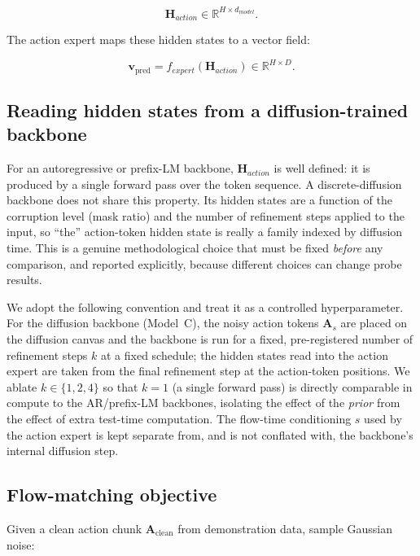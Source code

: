 \documentclass[11pt]{article}
\newcommand{\vect}[1]{\mathbf{#1}}
\newcommand{\Aclean}{\vect{A}_{\mathrm{clean}}}
\newcommand{\As}{\vect{A}_{s}}
\newcommand{\vpred}{\vect{v}_{\mathrm{pred}}}
\begin{document}
\begin{equation}
    \vect{H}_{action} \in \mathbb{R}^{H \times d_{model}}.
\end{equation}

The action expert maps these hidden states to a vector field:

\begin{equation}
    \vpred = f_{expert}(\vect{H}_{action}) \in \mathbb{R}^{H \times D}.
\end{equation}

\subsection{Reading hidden states from a diffusion-trained backbone}
\label{subsec:hidden-read}

For an autoregressive or prefix-LM backbone, $\vect{H}_{action}$ is well defined: it is produced by a single forward pass over the token sequence. A discrete-diffusion backbone does not share this property. Its hidden states are a function of the corruption level (mask ratio) and the number of refinement steps applied to the input, so ``the'' action-token hidden state is really a family indexed by diffusion time. This is a genuine methodological choice that must be fixed \emph{before} any comparison, and reported explicitly, because different choices can change probe results.

We adopt the following convention and treat it as a controlled hyperparameter. For the diffusion backbone (Model~C), the noisy action tokens $\As$ are placed on the diffusion canvas and the backbone is run for a fixed, pre-registered number of refinement steps $k$ at a fixed schedule; the hidden states read into the action expert are taken from the final refinement step at the action-token positions. We ablate $k \in \{1, 2, 4\}$ so that $k{=}1$ (a single forward pass) is directly comparable in compute to the AR/prefix-LM backbones, isolating the effect of the \emph{prior} from the effect of extra test-time computation. The flow-time conditioning $s$ used by the action expert is kept separate from, and is not conflated with, the backbone's internal diffusion step.

\subsection{Flow-matching objective}

Given a clean action chunk $\Aclean$ from demonstration data, sample Gaussian noise:
\end{document}
